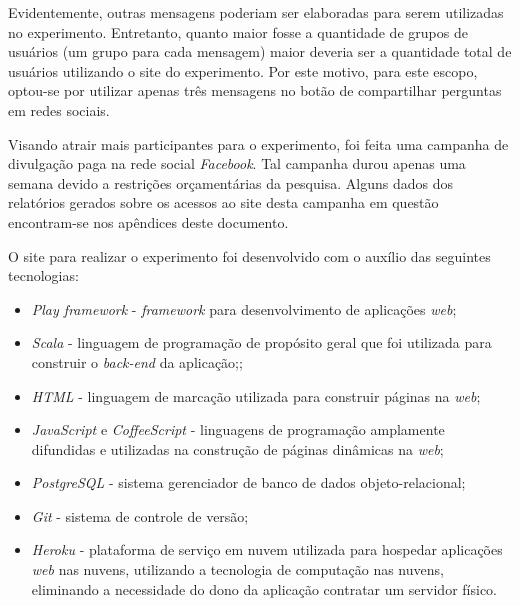 Evidentemente, outras mensagens poderiam ser elaboradas para serem utilizadas no experimento. Entretanto, quanto maior fosse a quantidade de grupos de usuários (um grupo para cada mensagem) maior deveria ser a quantidade total de usuários utilizando o site do experimento. Por este motivo, para este escopo, optou-se por utilizar apenas três mensagens no botão de compartilhar perguntas em redes sociais. 

Visando atrair mais participantes para o experimento, foi feita uma campanha de divulgação paga na rede social \textit{Facebook}. Tal campanha durou apenas uma semana devido a restrições orçamentárias da pesquisa. Alguns dados dos relatórios gerados sobre os acessos ao site desta campanha em questão encontram-se nos apêndices deste documento.

O site para realizar o experimento foi desenvolvido com o auxílio das seguintes tecnologias:
    \begin{itemize}
        \item \textit{Play framework} \cite{hunt2014play} - \textit{framework} para desenvolvimento de aplicações \textit{web};
        \item \textit{Scala} \cite{odersky2008programming} - linguagem de programação de propósito geral que foi utilizada para construir o \textit{back-end} da aplicação;;
        \item \textit{HTML} \cite{pilgrim2010html5} - linguagem de marcação utilizada para construir páginas na \textit{web};
        \item \textit{JavaScript} \cite{flanagan2006javascript} e \textit{CoffeeScript} \cite{maccaw2012little} - linguagens de programação amplamente difundidas e utilizadas na construção de páginas dinâmicas na \textit{web};
        \item \textit{PostgreSQL} \cite{obe2014postgresql} - sistema gerenciador de banco de dados objeto-relacional;
        \item \textit{Git} \cite{loeliger2012version} - sistema de controle de versão;
        \item \textit{Heroku} \cite{middleton2013heroku} - plataforma de serviço em nuvem utilizada para hospedar aplicações \textit{web} nas nuvens, utilizando a tecnologia de computação nas nuvens, eliminando a necessidade do dono da aplicação contratar um servidor físico.
    \end{itemize}

